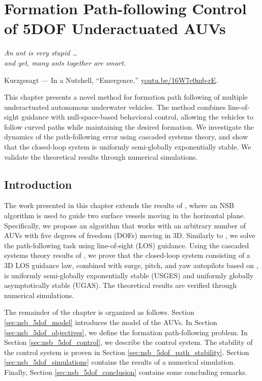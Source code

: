 \chapter{Formation Path-following Control of 5DOF Underactuated AUVs}
\label{chap:5dof_nsb}

\setlength{\epigraphwidth}{0.55\textwidth}
\epigraph{\it
    An ant is very stupid \dots \\ and yet, many ants together are smart.
}{
    Kurzgesagt --- In a Nutshell, ``Emergence,'' \url{youtu.be/16W7c0mb-rE}.
}

This chapter presents a novel method for formation path following of multiple underactuated autonomous underwater vehicles.
The method combines line-of-sight guidance with null-space-based behavioral control, allowing the vehicles to follow curved paths while maintaining the desired formation.
We investigate the dynamics of the path-following error using cascaded systems theory, and show that the closed-loop system is uniformly semi-globally exponentially stable.
We validate the theoretical results through numerical simulations.

\section{Introduction}

The work presented in this chapter extends the results of \cite{eek_formation_2021}, where an NSB algorithm is used to guide two surface vessels moving in the horizontal plane.
Specifically, we propose an algorithm that works with an arbitrary number of AUVs with five degrees of freedom (DOFs) moving in 3D.
Similarly to \cite{eek_formation_2021}, we solve the path-following task using line-of-sight (LOS) guidance.
Using the cascaded systems theory results of \cite{pettersen_lyapunov_2017}, we prove that the closed-loop system consisting of a 3D LOS guidance law, combined with surge, pitch, and yaw autopilots based on \cite{moe_LOS_2016}, is uniformly semi-globally exponentially stable (USGES) and uniformly globally asymptotically stable (UGAS).
The theoretical results are verified through numerical simulations.

The remainder of the chapter is organized as follows.
Section \ref{sec:nsb_5dof_model} introduces the model of the AUVs.
In Section \ref{sec:nsb_5dof_objectives}, we define the formation path-following problem.
In Section \ref{sec:nsb_5dof_control}, we describe the control system.
The stability of the control system is proven in Section \ref{sec:nsb_5dof_path_stability}.
Section \ref{sec:nsb_5dof_simulations} contains the results of a numerical simulation.
Finally, Section \ref{sec:nsb_5dof_conclusion} contains some concluding remarks.

